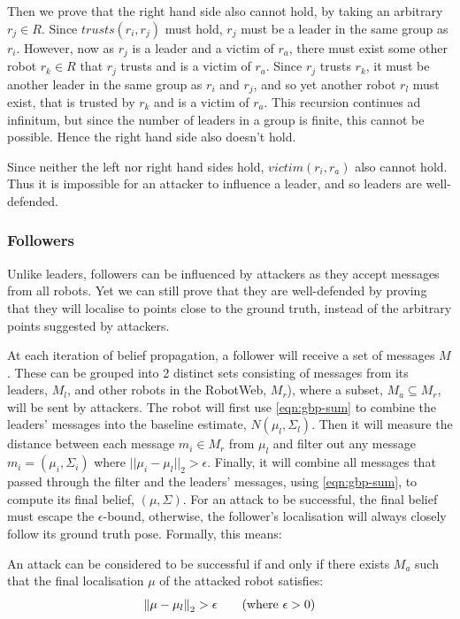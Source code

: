 Then we prove that the right hand side also cannot hold, by taking an arbitrary $r_j \in R$. Since $trusts(r_i, r_j)$ must hold, $r_j$ must be a leader in the same group as $r_i$. However, now as $r_j$ is a leader and a victim of $r_a$, there must exist some other robot $r_k \in R$ that $r_j$ trusts and is a victim of $r_a$. Since $r_j$ trusts $r_k$, it must be another leader in the same group as $r_i$ and $r_j$, and so yet another robot $r_l$ must exist, that is trusted by $r_k$ and is a victim of $r_a$. This recursion continues ad infinitum, but since the number of leaders in a group is finite, this cannot be possible. Hence the right hand side also doesn't hold.

Since neither the left nor right hand sides hold, $victim(r_i, r_a)$ also cannot hold. Thus it is impossible for an attacker to influence a leader, and so leaders are well-defended.
\subsubsection{Followers}
Unlike leaders, followers can be influenced by attackers as they accept messages from all robots. Yet we can still prove that they are well-defended by proving that they will localise to points close to the ground truth, instead of the arbitrary points suggested by attackers. 

At each iteration of belief propagation, a follower will receive a set of messages $M$. These can be grouped into 2 distinct sets consisting of messages from its leaders, $M_l$, and other robots in the RobotWeb, $M_r$), where a subset, $M_a \subseteq M_r$, will be sent by attackers. The robot will first use \autoref{eqn:gbp-sum} to combine the leaders' messages into the baseline estimate, $N(\mu_l, \Sigma_l)$. Then it will measure the distance between each message $m_i \in M_r$ from $\mu_l$ and filter out any message $m_i = (\mu_i, \Sigma_i)$ where $||\mu_i - \mu_l||_2 > \epsilon$. Finally, it will combine all messages that passed through the filter and the leaders' messages, using \autoref{eqn:gbp-sum}, to compute its final belief, $(\mu, \Sigma)$. For an attack to be successful, the final belief must escape the $\epsilon$-bound, otherwise, the follower's localisation will always closely follow its ground truth pose. Formally, this means:

\begin{theorem}
\label{theo:successful-attack-criteria}
An attack can be considered to be successful if and only if there exists $M_a$ such that the final localisation $\mu$ of the attacked robot satisfies: \[\left\lVert\mu - \mu_l\right\rVert_2 > \epsilon \tag{where $\epsilon > 0$}\]
\end{theorem}

